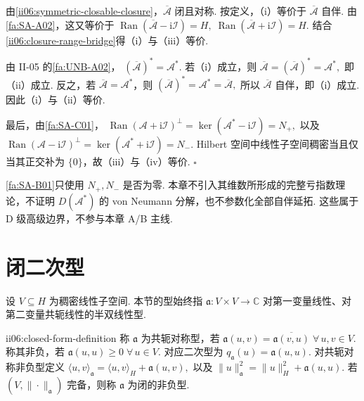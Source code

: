 \begin{FAProof}
由\autoref{ii06:symmetric-closable-closure}，\(\displaystyle\overline{\mathcal A}\) 闭且对称. 按定义，（i）等价于 \(\displaystyle\overline{\mathcal A}\) 自伴. 由\autoref{fa:SA-A02}，这又等价于
\(\displaystyle \operatorname{Ran}(\overline{\mathcal A}-\mathrm{i}\mathcal I)=H,\; \operatorname{Ran}(\overline{\mathcal A}+\mathrm{i}\mathcal I)=H.\)
结合\autoref{ii06:closure-range-bridge}得（i）与（iii）等价.

由 II-05 的\autoref{fa:UNB-A02}，
\(\displaystyle (\overline{\mathcal A})^*=\mathcal A^*.\)
若（i）成立，则
\(\displaystyle \overline{\mathcal A} = (\overline{\mathcal A})^* = \mathcal A^*,\)
即（ii）成立. 反之，若 \(\displaystyle\overline{\mathcal A}=\mathcal A^*\)，则
\(\displaystyle (\overline{\mathcal A})^* = \mathcal A^* = \overline{\mathcal A},\)
所以 \(\displaystyle\overline{\mathcal A}\) 自伴，即（i）成立. 因此（i）与（ii）等价.

最后，由\autoref{fa:SA-C01}，
\(\displaystyle \operatorname{Ran}(\mathcal A+\mathrm{i}\mathcal I)^\perp = \ker(\mathcal A^*-\mathrm{i}\mathcal I) = N_+,\)
以及
\(\displaystyle \operatorname{Ran}(\mathcal A-\mathrm{i}\mathcal I)^\perp = \ker(\mathcal A^*+\mathrm{i}\mathcal I) = N_-.\)
Hilbert 空间中线性子空间稠密当且仅当其正交补为 \(\displaystyle\{0\}\)，故（iii）与（iv）等价.
\hfill\(\square\)
\end{FAProof}

\begin{FARemark}[亏子空间理论的边界]
\autoref{fa:SA-B01}只使用 \(\displaystyle N_+,N_-\) 是否为零. 本章不引入其维数所形成的完整亏指数理论，不证明 \(\displaystyle D(\mathcal A^*)\) 的 von Neumann 分解，也不参数化全部自伴延拓. 这些属于 D 级高级边界，不参与本章 A/B 主线.
\end{FARemark}

\section{闭二次型}\label{sec:ii06-closed-forms}

设 \(\displaystyle V\subseteq H\) 为稠密线性子空间. 本节的型始终指
\(\displaystyle \mathfrak a:V\times V\to\mathbb C\)
对第一变量线性、对第二变量共轭线性的半双线性型.

\begin{FADefinition}{ii06:closed-form-definition}
称 \(\displaystyle\mathfrak a\) 为共轭对称型，若
\(\displaystyle \mathfrak a(u,v) = \overline{\mathfrak a(v,u)} \; \forall\,u,v\in V.\)
称其非负，若
\(\displaystyle \mathfrak a(u,u)\geqslant0 \; \forall\,u\in V.\)
对应二次型为 \(\displaystyle q_{\mathfrak a}(u)=\mathfrak a(u,u)\). 对共轭对称非负型定义
\(\displaystyle \langle u,v\rangle_{\mathfrak a} = \langle u,v\rangle_H+\mathfrak a(u,v),\)
以及
\(\displaystyle \|u\|_{\mathfrak a}^2 = \|u\|_H^2+\mathfrak a(u,u).\)
若 \(\displaystyle(V,\|\cdot\|_{\mathfrak a})\) 完备，则称 \(\displaystyle\mathfrak a\) 为闭的非负型.
\end{FADefinition}

